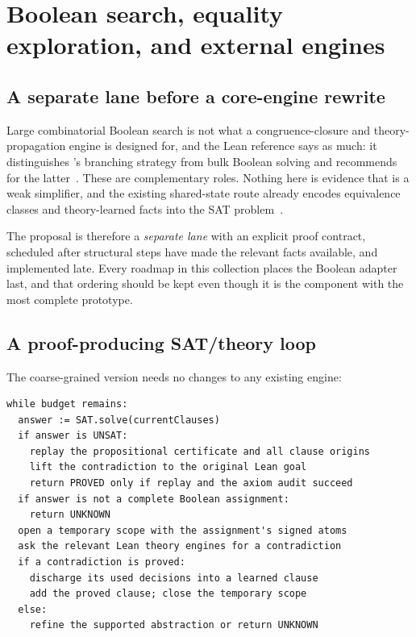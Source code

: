 \section{Boolean search, equality exploration, and external engines}
\label{sec:boolean}

\subsection{A separate lane before a core-engine rewrite}

Large combinatorial Boolean search is not what a congruence-closure and
theory-propagation engine is designed for, and the Lean reference says as much:
it distinguishes \grind{}'s branching strategy from bulk Boolean solving and
recommends  for the latter~\cite{grind-ref}. These are
complementary roles. Nothing here is evidence that \grind{} is a weak
simplifier, and the existing shared-state  route
already encodes equivalence classes and theory-learned facts into the SAT
problem~\cite{lean-release-434}.

The proposal is therefore a \emph{separate lane} with an explicit proof
contract, scheduled after structural steps have made the relevant facts
available, and implemented late. Every roadmap in this collection places the
Boolean adapter last, and that ordering should be kept even though it is the
component with the most complete prototype.

\subsection{A proof-producing SAT/theory loop}

The coarse-grained version needs no changes to any existing engine:

\begin{lstlisting}
while budget remains:
  answer := SAT.solve(currentClauses)
  if answer is UNSAT:
    replay the propositional certificate and all clause origins
    lift the contradiction to the original Lean goal
    return PROVED only if replay and the axiom audit succeed
  if answer is not a complete Boolean assignment:
    return UNKNOWN
  open a temporary scope with the assignment's signed atoms
  ask the relevant Lean theory engines for a contradiction
  if a contradiction is proved:
    discharge its used decisions into a learned clause
    add the proved clause; close the temporary scope
  else:
    refine the supported abstraction or return UNKNOWN
\end{lstlisting}

